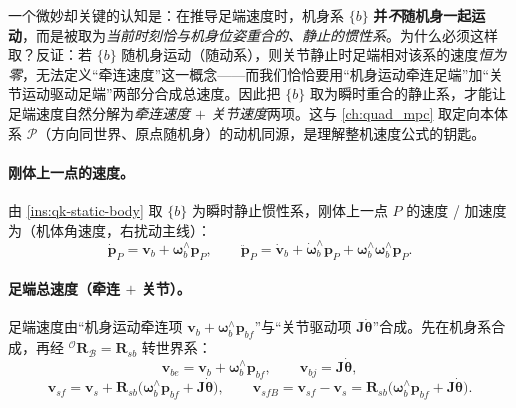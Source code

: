 \begin{insight}\label{ins:qk-static-body}
一个微妙却关键的认知是：在推导足端速度时，机身系 $\{b\}$ \textbf{并\emph{不}随机身一起运动}，而是被取为\emph{当前时刻恰与机身位姿重合的、静止的惯性系}\cite{unitree2023quadruped}。为什么必须这样取？反证：若 $\{b\}$ 随机身运动（随动系），则关节静止时足端相对该系的速度\emph{恒为零}，无法定义“牵连速度”这一概念——而我们恰恰要用“机身运动牵连足端”加“关节运动驱动足端”两部分合成总速度。因此把 $\{b\}$ 取为瞬时重合的静止系，才能让足端速度自然分解为\emph{牵连速度 $+$ 关节速度}两项。这与 \cref{ch:quad_mpc} 取定向本体系 $\mathcal{P}$（方向同世界、原点随机身）的动机同源，是理解整机速度公式的钥匙。
\end{insight}

\paragraph{刚体上一点的速度。}
由 \cref{ins:qk-static-body} 取 $\{b\}$ 为瞬时静止惯性系，刚体上一点 $P$ 的速度 / 加速度为（机体角速度，右扰动主线）\cite{unitree2023quadruped}：
\begin{equation}
  \dot{\boldsymbol{p}}_P=\boldsymbol{v}_b+\boldsymbol{\omega}_b^{\wedge}\boldsymbol{p}_P,
  \qquad
  \ddot{\boldsymbol{p}}_P=\dot{\boldsymbol{v}}_b+\dot{\boldsymbol{\omega}}_b^{\wedge}\boldsymbol{p}_P+\boldsymbol{\omega}_b^{\wedge}\boldsymbol{\omega}_b^{\wedge}\boldsymbol{p}_P.
  \label{eq:qk-point-vel}
\end{equation}

\paragraph{足端总速度（牵连 $+$ 关节）。}
足端速度由“机身运动牵连项 $\boldsymbol{v}_b+\boldsymbol{\omega}_b^{\wedge}\boldsymbol{p}_{bf}$”与“关节驱动项 $\mathbf{J}\dot{\boldsymbol{\theta}}$”合成。先在机身系合成，再经 ${}^{\mathcal{O}}\mathbf{R}_{\mathcal{B}}=\mathbf{R}_{sb}$ 转世界系\cite{unitree2023quadruped}：
\begin{equation}
  \boldsymbol{v}_{be}=\boldsymbol{v}_b+\boldsymbol{\omega}_b^{\wedge}\boldsymbol{p}_{bf},
  \qquad
  \boldsymbol{v}_{bj}=\mathbf{J}\dot{\boldsymbol{\theta}},
  \label{eq:qk-foot-vel-body}
\end{equation}
\begin{equation}
  \boldsymbol{v}_{sf}=\boldsymbol{v}_s+\mathbf{R}_{sb}\big(\boldsymbol{\omega}_b^{\wedge}\boldsymbol{p}_{bf}+\mathbf{J}\dot{\boldsymbol{\theta}}\big),
  \qquad
  \boldsymbol{v}_{sfB}=\boldsymbol{v}_{sf}-\boldsymbol{v}_s=\mathbf{R}_{sb}\big(\boldsymbol{\omega}_b^{\wedge}\boldsymbol{p}_{bf}+\mathbf{J}\dot{\boldsymbol{\theta}}\big).
  \label{eq:qk-foot-vel-world}
\end{equation}


